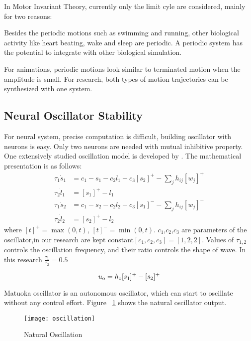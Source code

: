 In Motor Invariant Theory, currently only the limit cyle are considered, mainly for two reasons: 
\begin{itemize}
Besides the periodic motions such as swimming and running, other biological activity like heart beating, wake and sleep  are periodic.
A periodic system has the potential to integrate with other biological simulation.

For animations, periodic motions look similar to terminated motion when the amplitude is small. 
For \cms research, both types of motion trajectories can be synthesized with one system.
\end{itemize}

\subsection{Neural Oscillator Stability}
For neural system, precise computation is difficult,  building oscillator with neurons is easy. 
Only two neurons are needed with mutual inhibitive property.
One extensively studied oscillation model is developed by \citet{neurooscillation}. 
The mathematical presentation is as follows:
\begin{align}
\tau_{1} \dot{s}_{1}&=c_1-s_{1}-c_2 l_{1}-c_3 [s_{2}]^{+}-\sum_{j}h_{ij}[w_{j}]^{+} \nonumber\\
\tau_{2} \dot{l}_{1}&=[s_{1}]^{+}-l_{1} \nonumber\\
\tau_{1} \dot{s}_{2}&=c_1-s_{2}-c_2 l_{2}-c_3 [s_{1}]^{-}-\sum_{j}h_{ij}[w_{j}]^{-} \nonumber\\
\tau_{2} \dot{l}_{2}&=[s_{2}]^{+}-l_{2}\label{eq:matsuta}
\end{align}
where $[t]^{+}=\max(0,t)$, $[t]^{-}=\min(0,t)$.
$c_1$,$c_2$,$c_3$ are parameters of the oscillator,in our research are kept constant$[c_1,c_2,c_3]=[1,2,2]$.
Values of $\tau_{1,2}$ controls the oscillation frequency, and their ratio controls the shape of wave.
In this research $\frac{\tau_{1}}{\tau_{2}}=0.5$


\begin{equation}
u_{\mathrm{o}}=h_{\mathrm{o}}[s_{1}]^{+}-[s_{2}]^{+}
\end{equation}







Matuoka oscillator is an autonomous oscillator, which can start to oscillate without any control effort.
Figure ~\ref{fig:natural-oscilation} shows the natural oscillator output.
\begin{figure}[h]
\begin{center}
\texttt{[image: oscillation]}
\caption{Natural Oscillation}
\label{fig:natural-oscilation}
\end{center}
\end{figure}





